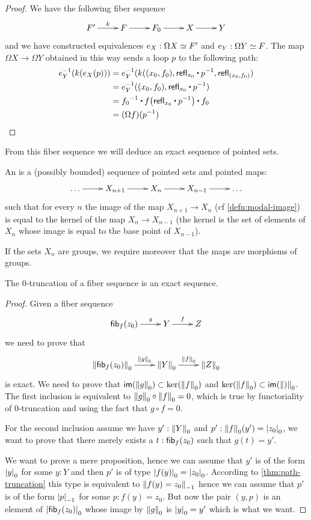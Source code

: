 \begin{proof}
  We have the following fiber sequence
  \[\xymatrix{F' \ar^-k[r] & F \ar[r] & F_0 \ar[r] & X \ar[r] & Y}\]
  and we have constructed equivalences $e_X:\eqv{\Omega X}{F'}$ and
  $e_Y:\eqv{\Omega Y}{F}$. The map $\Omega X\to\Omega Y$ obtained in this way
  sends a loop $p$ to the following path:
  \begin{align*}
    e_Y^{-1}(k(e_X(p))) &=
    e_Y^{-1}(k((x_0,f_0),\refl{x_0}\ct\rev{p},\refl{(x_0,f_0)}) \\
    &= e_Y^{-1}((x_0,f_0),\refl{x_0}\ct\rev{p}) \\
    &= \rev{f_0}\ct\ap{f}{\refl{x_0}\ct\rev{p}}\ct f_0 \\
    &= (\Omega f)(\rev{p}) \qedhere
  \end{align*}
\end{proof}

From this fiber sequence we will deduce an exact sequence of pointed sets.

\begin{defn}
  An  is a (possibly bounded) sequence of pointed sets
  and pointed maps:
  \[\xymatrix{\dots \ar[r] & X_{n+1} \ar[r] & X_n \ar[r] & X_{n-1} \ar[r] &
    \dots}\]
  such that for every $n$ the image of the map $X_{n+1} \to X_n$ (cf
  \autoref{defn:modal-image}) is equal to the kernel of the map $X_n \to X_{n-1}$
  (the kernel is the set of elements of $X_n$ whose image is equal to the base
  point of $X_{n-1}$).

  If the sets $X_n$ are groups, we require moreover that the maps are morphisms
  of groups.
\end{defn}

\begin{lem}
  The $0$-truncation of a fiber sequence is an exact sequence.
\end{lem}
\begin{proof}
  Given a fiber sequence
  \[\xymatrix{\hfib{f}{z_0} \ar^-g[r] & Y \ar^-f[r] & Z}\]
  we need to prove that
  \[\xymatrix{\trunc{0}{\hfib{f}{z_0}} \ar^-{\trunc0g}[r] & \trunc0{Y}
    \ar^-{\trunc0{f}}[r] & \trunc0{Z}}\]
  is exact.
  We need to prove that $\im(\trunc0g)\subset\ker(\trunc0f)$ and
  $\ker(\trunc0f)\subset\im(\trunc0)$.
  The first inclusion is equivalent to $\trunc0g\circ\trunc0f=0$, which is true
  by functoriality of 0-truncation and using the fact that $g\circ f=0$.

  For the second inclusion assume we have $y':\trunc0Y$ and
  $p':\trunc0f(y')=\tproj0{z_0}$, we want to prove that there merely exists a
  $t:\hfib{f}{z_0}$ such that $g(t)=y'$.

  We want to prove a mere proposition, hence we can assume that $y'$ is of the
  form $\tproj0y$ for some $y:Y$ and then $p'$ is of type
  $\tproj0{f(y)}=\tproj0{z_0}$. According to \autoref{thm:path-truncation} this
  type is equivalent to $\trunc{-1}{f(y)=z_0}$ hence we can assume that $p'$ is
  of the form $\tproj{-1}{p}$ for some $p:f(y)=z_0$. But now the pair $(y,p)$ is
  an element of $\tproj0{\hfib{f}{z_0}}$ whose image by $\trunc0g$ is
  $\tproj0y=y'$ which is what we want.
\end{proof}


